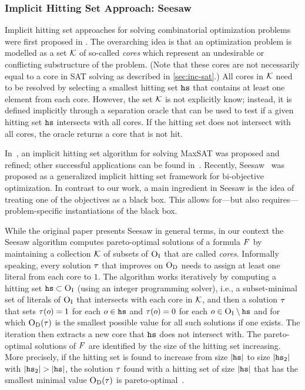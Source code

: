 \subsubsection{Implicit Hitting Set Approach: Seesaw\label{sec:seesaw}}

Implicit hitting set approaches for solving combinatorial optimization problems were first proposed in \textcite{DBLP:journals/ior/Moreno-CentenoK13}.
The overarching idea is that an optimization problem is modelled as a set $\mathcal{K}$ of so-called \emph{cores} which represent an undesirable or conflicting substructure of the problem.
(Note that these cores are not necessarily equal to a core in SAT solving as described in \cref{sec:inc-sat}.)
All cores in $\mathcal{K}$ need to be resolved by selecting a smallest hitting set $\texttt{hs}$ that contains at least one element from each core.
However, the set $\mathcal{K}$ is not explicitly know;
instead, it is defined implicitly through a separation oracle that can be used to test if a given hitting set $\texttt{hs}$ intersects with all cores.
If the hitting set does not intersect with all cores, the oracle returns a core that is not hit.

In~\textcite{DBLP:conf/cp/DaviesB13,DBLP:conf/sat/DaviesB13,DBLP:conf/cp/DaviesB11,DBLP:conf/sat/BergBP20}, an implicit hitting set algorithm for solving MaxSAT was proposed and refined;
other successful applications can be found in~\textcite{DBLP:conf/cp/IgnatievPLM15,DBLP:conf/kr/SaikkoWJ16,DBLP:conf/cade/FazekasBB18,DBLP:conf/kr/SaikkoDAJ18}.
Recently, Seesaw~\autocite{DBLP:conf/cp/JanotaMSM21} was proposed as a generalized implicit hitting set framework for bi-objective optimization.
In contrast to our work, a main ingredient in Seesaw is the idea of treating one of the objectives as a black box.
This allows for---but also requires---problem-specific instantiations of the black box.

While the original paper presents Seesaw in general terms, in our context the Seesaw algorithm computes pareto-optimal solutions of a formula $F$ by maintaining a collection $\mathcal{K}$ of subsets of $\textsc{O}_{\text{I}}$ that are called \emph{cores}.
Informally speaking, every solution $\tau$ that improves on $\textsc{O}_{\text{D}}$ needs to assign at least one literal from each core to $1$.
The algorithm works iteratively by computing a hitting set $\texttt{hs} \subset \textsc{O}_{\text{I}}$ (using an integer programming solver), i.e., a subset-minimal set of literals of $\textsc{O}_{\text{I}}$ that intersects with each core in $\mathcal{K}$, and then a solution $\tau$ that sets $\tau(o) = 1$ for each $o \in \texttt{hs}$ and $\tau(o) = 0$ for each $o \in \textsc{O}_{\text{I}} \setminus \texttt{hs}$ and for which $\textsc{O}_{\text{D}}(\tau)$ is the smallest possible value for all such solutions if one exists.
The iteration then extracts a new core that $\texttt{hs}$ does not intersect with.
The pareto-optimal solutions of $F$ are identified by the size of the hitting set increasing.
More precisely, if the hitting set is found to increase from size $|\texttt{hs}|$ to size $|\texttt{hs}_2|$ with $|\hs_2|>|\hs|$, the solution $\tau$ found with a hitting set of size $|\texttt{hs}|$ that has the smallest minimal value $\textsc{O}_{\text{D}}(\tau)$ is pareto-optimal~\autocite{DBLP:conf/cp/JanotaMSM21}.

